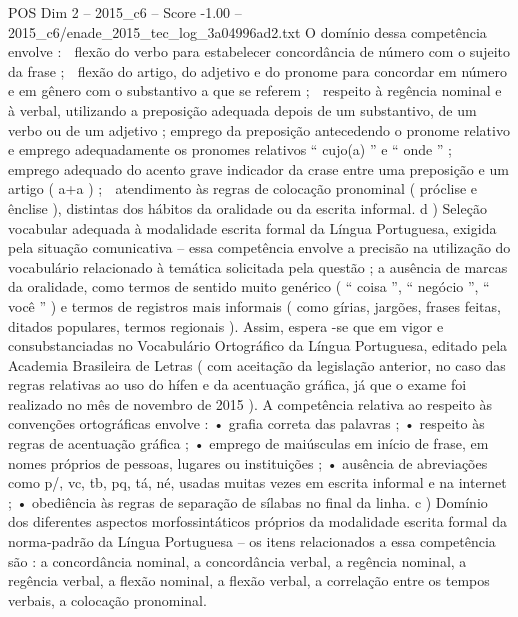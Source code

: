 \begin{textsample}{POS Dim 2 – 2015\_c6 – Score -1.00 – 2015\_c6/enade\_2015\_tec\_log\_3a04996ad2.txt}
O domínio dessa competência envolve :  flexão do verbo para estabelecer concordância de número com o sujeito da frase ;  flexão do artigo, do adjetivo e do pronome para concordar em número e em gênero com o substantivo a que se referem ;  respeito à regência nominal e à verbal, utilizando a preposição adequada depois de um substantivo, de um verbo ou de um adjetivo ; emprego da preposição antecedendo o pronome relativo e emprego adequadamente os pronomes relativos “ cujo(a) ” e “ onde ” ;  emprego adequado do acento grave indicador da crase entre uma preposição e um artigo ( a+a ) ;  atendimento às regras de colocação pronominal ( próclise e ênclise ), distintas dos hábitos da oralidade ou da escrita informal. d ) Seleção vocabular adequada à modalidade escrita formal da Língua Portuguesa, exigida pela situação comunicativa – essa competência envolve a precisão na utilização do vocabulário relacionado à temática solicitada pela questão ; a ausência de marcas da oralidade, como termos de sentido muito genérico ( “ coisa ”, “ negócio ”, “ você ” ) e termos de registros mais informais ( como gírias, jargões, frases feitas, ditados populares, termos regionais ).
Assim, espera -se que em vigor e consubstanciadas no Vocabulário Ortográfico da Língua Portuguesa, editado pela Academia Brasileira de Letras ( com aceitação da legislação anterior, no caso das regras relativas ao uso do hífen e da acentuação gráfica, já que o exame foi realizado no mês de novembro de 2015 ).
A competência relativa ao respeito às convenções ortográficas envolve : • grafia correta das palavras ; • respeito às regras de acentuação gráfica ; • emprego de maiúsculas em início de frase, em nomes próprios de pessoas, lugares ou instituições ; • ausência de abreviações como p/, vc, tb, pq, tá, né, usadas muitas vezes em escrita informal e na internet ; • obediência às regras de separação de sílabas no final da linha. c ) Domínio dos diferentes aspectos morfossintáticos próprios da modalidade escrita formal da norma-padrão da Língua Portuguesa – os itens relacionados a essa competência são : a concordância nominal, a concordância verbal, a regência nominal, a regência verbal, a flexão nominal, a flexão verbal, a correlação entre os tempos verbais, a colocação pronominal.

\end{textsample}
